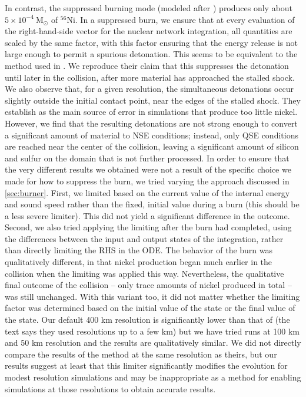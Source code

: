 \documentclass[twocolumn,numberedappendix]{../aastex6}
\newcommand{\msolar}{\mathrm{M}_\odot}
\begin{document}
In contrast, the suppressed burning mode (modeled after \citet{kushnir:2013}) produces only about
$5 \times 10^{-4}\ \msolar$ of $^{56}$Ni. In a suppressed burn, we ensure that at every evaluation
of the right-hand-side vector for the nuclear network integration, all quantities are scaled by the
same factor, with this factor ensuring that the energy release is not large enough to permit a
spurious detonation. This seems to be equivalent to the method used in \citet{kushnir:2013}. We
reproduce their claim that this suppresses the detonation until later in the collision, after more
material has approached the stalled shock. We also observe that, for a given resolution, the simultaneous
detonations occur slightly outside the initial contact point, near the edges of the stalled shock. They
establish as the main source of error in simulations that produce too little nickel. However, we find
that the resulting detonations are not strong enough to convert a significant amount of material to NSE
conditions; instead, only QSE conditions are reached near the center of the collision, leaving a significant
amount of silicon and sulfur on the domain that is not further processed. In order to ensure that the
very different results we obtained were not a result of the specific choice we made for how to suppress
the burn, we tried varying the approach discussed in \autoref{sec:burner}. First, we limited based on
the current value of the internal energy and sound speed rather than the fixed, initial value during a burn
(this should be a less severe limiter). This did not yield a significant difference in the outcome. Second,
we also tried applying the limiting after the burn had completed, using the differences between the input
and output states of the integration, rather than directly limiting the RHS in the ODE. The behavior of the
burn was qualitatively different, in that nickel production began much earlier in the collision when the limiting
was applied this way. Nevertheless, the qualitative final outcome of the collision -- only trace amounts
of nickel produced in total -- was still unchanged. With this variant too, it did not matter whether the limiting
factor was determined based on the initial value of the state or the final value of the state.
Our default 400 km resolution is significantly lower than that of \citeauthor{kushnir:2013} (the text
says they used resolutions up to a few km) but we have tried runs at 100 km and 50 km resolution and
the results are qualitatively similar. We did not directly compare the results of the method at
the same resolution as theirs, but our results suggest at least that this limiter significantly
modifies the evolution for modest resolution simulations and may be inappropriate as a method for enabling
simulations at those resolutions to obtain accurate results.
\end{document}
